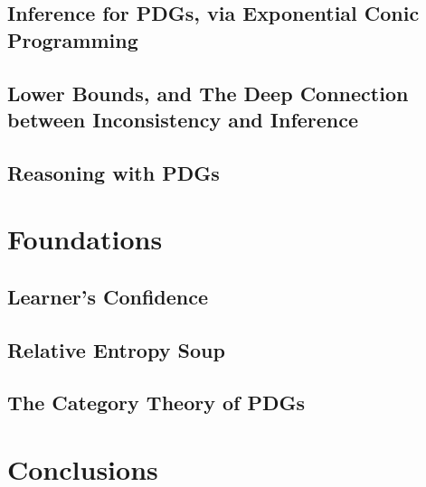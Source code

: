 \documentclass[tocprelim,
    ]{cornellmodified}
\begin{document}
\chapter{Inference for PDGs, via Exponential Conic Programming}
    

\chapter[Lower Bounds, and the Deep Connection\texorpdfstring{\\}{}between Inconsistency and Inference]%
    {Lower Bounds, and The Deep Connection between Inconsistency and Inference}
    

\chapter{Reasoning with PDGs}
    \label{chap:reason}


\part{Foundations}

\chapter{Learner's Confidence}
    \label{chap:conf}

\chapter{Relative Entropy Soup}
    \label{chap:relent-soup}

\chapter{The Category Theory of PDGs}
    \label{chap:PDG-cat}

\part{Conclusions}
\chapter{}
    


% 
% 

\end{document}
